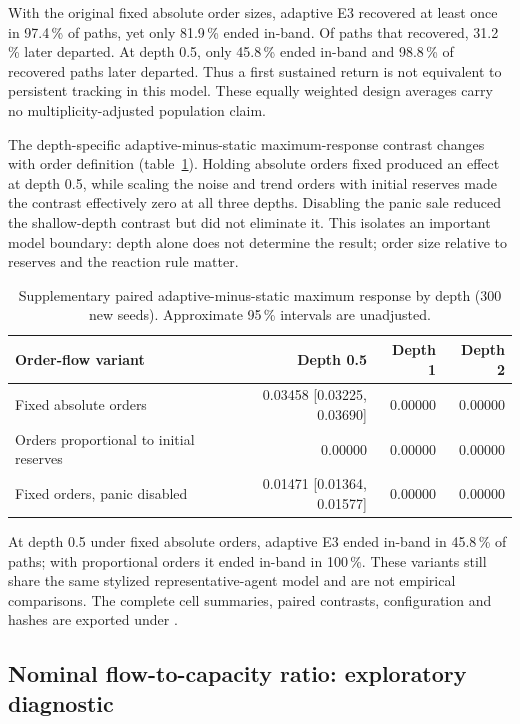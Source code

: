 With the original fixed absolute order sizes, adaptive E3 recovered at least once in 97.4\,\% of paths, yet only 81.9\,\% ended in-band. Of paths that recovered, 31.2\,\% later departed. At depth 0.5, only 45.8\,\% ended in-band and 98.8\,\% of recovered paths later departed. Thus a first sustained return is not equivalent to persistent tracking in this model. These equally weighted design averages carry no multiplicity-adjusted population claim.

The depth-specific adaptive-minus-static maximum-response contrast changes with order definition (table~\ref{tab:engineering-sensitivity}). Holding absolute orders fixed produced an effect at depth 0.5, while scaling the noise and trend orders with initial reserves made the contrast effectively zero at all three depths. Disabling the panic sale reduced the shallow-depth contrast but did not eliminate it. This isolates an important model boundary: depth alone does not determine the result; order size relative to reserves and the reaction rule matter.

\begin{table}[htbp]
\centering
\caption{Supplementary paired adaptive-minus-static maximum response by depth (300 new seeds). Approximate 95\,\% intervals are unadjusted.}
\label{tab:engineering-sensitivity}
\small
\begin{tabular}{@{}lrrr@{}}
\toprule
Order-flow variant & Depth 0.5 & Depth 1 & Depth 2 \\
\midrule
Fixed absolute orders & 0.03458 [0.03225, 0.03690] & 0.00000 & 0.00000 \\
Orders proportional to initial reserves & 0.00000 & 0.00000 & 0.00000 \\
Fixed orders, panic disabled & 0.01471 [0.01364, 0.01577] & 0.00000 & 0.00000 \\
\bottomrule
\end{tabular}
\end{table}

At depth 0.5 under fixed absolute orders, adaptive E3 ended in-band in 45.8\,\% of paths; with proportional orders it ended in-band in 100\,\%. These variants still share the same stylized representative-agent model and are not empirical comparisons. The complete cell summaries, paired contrasts, configuration and hashes are exported under .

\subsection{Nominal flow-to-capacity ratio: exploratory diagnostic}

